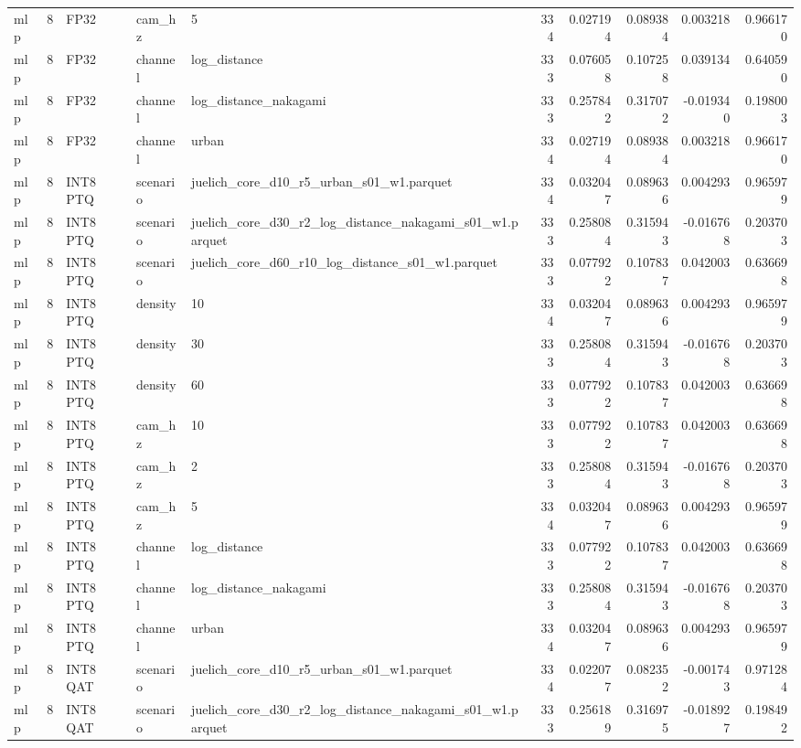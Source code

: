 \begin{tabular}{lrlllrrrrr}
mlp & 8 & FP32 & cam\_hz & 5 & 334 & 0.027194 & 0.089384 & 0.003218 & 0.966170 \\
mlp & 8 & FP32 & channel & log\_distance & 333 & 0.076058 & 0.107258 & 0.039134 & 0.640590 \\
mlp & 8 & FP32 & channel & log\_distance\_nakagami & 333 & 0.257842 & 0.317072 & -0.019340 & 0.198003 \\
mlp & 8 & FP32 & channel & urban & 334 & 0.027194 & 0.089384 & 0.003218 & 0.966170 \\
mlp & 8 & INT8 PTQ & scenario & juelich\_core\_d10\_r5\_urban\_s01\_w1.parquet & 334 & 0.032047 & 0.089636 & 0.004293 & 0.965979 \\
mlp & 8 & INT8 PTQ & scenario & juelich\_core\_d30\_r2\_log\_distance\_nakagami\_s01\_w1.parquet & 333 & 0.258084 & 0.315943 & -0.016768 & 0.203703 \\
mlp & 8 & INT8 PTQ & scenario & juelich\_core\_d60\_r10\_log\_distance\_s01\_w1.parquet & 333 & 0.077922 & 0.107837 & 0.042003 & 0.636698 \\
mlp & 8 & INT8 PTQ & density & 10 & 334 & 0.032047 & 0.089636 & 0.004293 & 0.965979 \\
mlp & 8 & INT8 PTQ & density & 30 & 333 & 0.258084 & 0.315943 & -0.016768 & 0.203703 \\
mlp & 8 & INT8 PTQ & density & 60 & 333 & 0.077922 & 0.107837 & 0.042003 & 0.636698 \\
mlp & 8 & INT8 PTQ & cam\_hz & 10 & 333 & 0.077922 & 0.107837 & 0.042003 & 0.636698 \\
mlp & 8 & INT8 PTQ & cam\_hz & 2 & 333 & 0.258084 & 0.315943 & -0.016768 & 0.203703 \\
mlp & 8 & INT8 PTQ & cam\_hz & 5 & 334 & 0.032047 & 0.089636 & 0.004293 & 0.965979 \\
mlp & 8 & INT8 PTQ & channel & log\_distance & 333 & 0.077922 & 0.107837 & 0.042003 & 0.636698 \\
mlp & 8 & INT8 PTQ & channel & log\_distance\_nakagami & 333 & 0.258084 & 0.315943 & -0.016768 & 0.203703 \\
mlp & 8 & INT8 PTQ & channel & urban & 334 & 0.032047 & 0.089636 & 0.004293 & 0.965979 \\
mlp & 8 & INT8 QAT & scenario & juelich\_core\_d10\_r5\_urban\_s01\_w1.parquet & 334 & 0.022077 & 0.082352 & -0.001743 & 0.971284 \\
mlp & 8 & INT8 QAT & scenario & juelich\_core\_d30\_r2\_log\_distance\_nakagami\_s01\_w1.parquet & 333 & 0.256189 & 0.316975 & -0.018927 & 0.198492 \\

\end{tabular}
